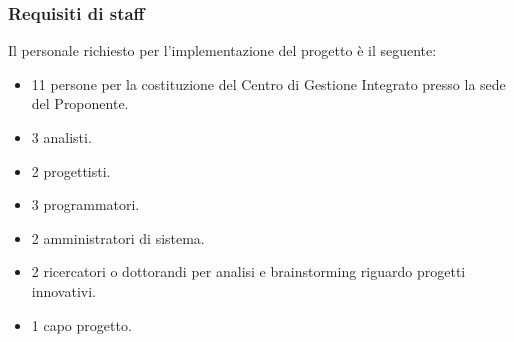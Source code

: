                 \subsubsection{Requisiti di staff}
                	Il personale richiesto per l'implementazione del progetto è il seguente:
                    \begin{itemize}
                    	\item 11 persone per la costituzione del Centro di Gestione Integrato presso la sede del Proponente.
                        \item 3 analisti.
                        \item 2 progettisti.
                        \item 3 programmatori.
                        \item 2 amministratori di sistema.
                        \item 2 ricercatori o dottorandi per analisi e brainstorming riguardo progetti innovativi.
                        \item 1 capo progetto.
                    \end{itemize}
				
